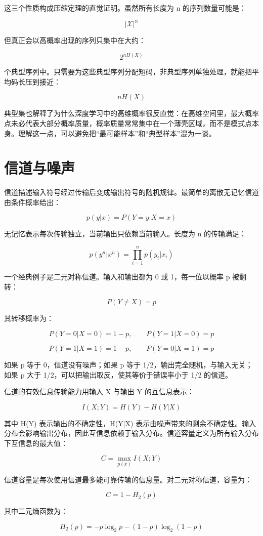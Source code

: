 这三个性质构成压缩定理的直觉证明。虽然所有长度为 n 的序列数量可能是：

\[
|\mathcal{X}|^n
\]

但真正会以高概率出现的序列只集中在大约：

\[
2^{nH(X)}
\]

个典型序列中。只需要为这些典型序列分配短码，非典型序列单独处理，就能把平均码长压到接近：

\[
nH(X)
\]

典型集也解释了为什么深度学习中的高维概率很反直觉：在高维空间里，最大概率点未必代表大部分概率质量，概率质量常常集中在一个薄壳区域，而不是模式点本身。理解这一点，可以避免把“最可能样本”和“典型样本”混为一谈。

\section{信道与噪声}

信道描述输入符号经过传输后变成输出符号的随机规律。最简单的离散无记忆信道由条件概率给出：

\[
p(y|x)=P(Y=y|X=x)
\]

无记忆表示每次传输独立，当前输出只依赖当前输入。长度为 n 的传输满足：

\[
p(y^n|x^n)=\prod_{i=1}^{n}p(y_i|x_i)
\]

一个经典例子是二元对称信道。输入和输出都为 0 或 1，每一位以概率 p 被翻转：

\[
P(Y\ne X)=p
\]

其转移概率为：

\[
P(Y=0|X=0)=1-p,\qquad P(Y=1|X=0)=p
\]

\[
P(Y=1|X=1)=1-p,\qquad P(Y=0|X=1)=p
\]

如果 p 等于 0，信道没有噪声；如果 p 等于 1/2，输出完全随机，与输入无关；如果 p 大于 1/2，可以把输出取反，使其等价于错误率小于 1/2 的信道。

信道的有效信息传输能力用输入 X 与输出 Y 的互信息表示：

\[
I(X;Y)=H(Y)-H(Y|X)
\]

其中 H(Y) 表示输出的不确定性，H(Y|X) 表示由噪声带来的剩余不确定性。输入分布会影响输出分布，因此互信息依赖于输入分布。信道容量定义为所有输入分布下互信息的最大值：

\[
C=\max_{p(x)}I(X;Y)
\]

信道容量是每次使用信道最多能可靠传输的信息量。对二元对称信道，容量为：

\[
C=1-H_2(p)
\]

其中二元熵函数为：

\[
H_2(p)=-p\log_2 p-(1-p)\log_2(1-p)
\]


